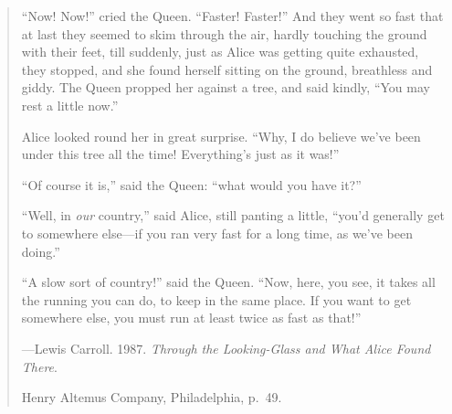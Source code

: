 

\cleardoublepage{}

\thispagestyle{empty} %

\vspace*{50 mm}

\small{}

\begin{quote}
	\protrudeleft``Now! Now!'' cried the Queen. 
	``Faster! Faster!'' 
	And they went so fast that at last they seemed to skim through the air, 
	hardly touching the ground with their feet, 
	till suddenly, 
	just as Alice was getting quite exhausted, 
	they stopped, 
	and she found herself sitting on the ground, 
	breathless and giddy. 
	The Queen propped her against a tree, and said kindly, 
	``You may rest a little now.''

	Alice looked round her in great surprise. 
	``Why, I do believe we've been under this tree all the time! 
	Everything's just as it was!''

	``Of course it is,'' said the Queen: ``what would you have it?'' %

	``Well, in \emph{our} country,'' said Alice, still panting a little, %
	``you'd generally get to somewhere else---if you ran very fast for a long time, 
	as we've been doing.''

	``A slow sort of country!'' said the Queen. 
	``Now, here, you see, it takes all the running you can do, to keep in the same place. 
	If you want to get somewhere else, you must run at least twice as fast as that!''

	\vspace{3 mm} %
	
	{
		\setlength{\parskip}{0.0pt} %
		\hfill---Lewis Carroll. 1987.
				 \emph{Through the Looking-Glass and What Alice Found There}.
	
		\hfill Henry Altemus Company, Philadelphia, p.~49.
	}
\end{quote}

\normalsize{}



